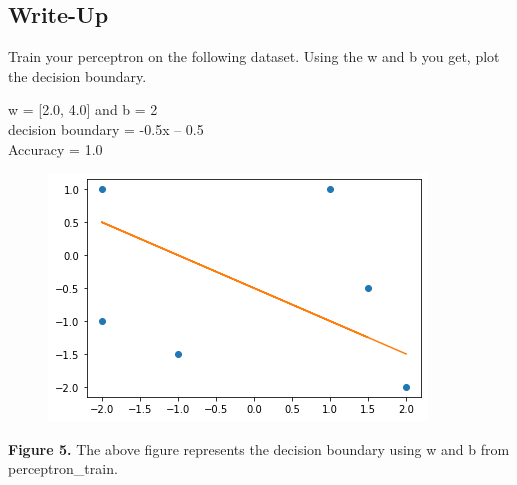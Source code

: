 \documentclass[11pt]{article}
\theoremstyle{definition}
\begin{document}
\clearpage
\subsection{Write-Up}
\begin{shaded}
Train your perceptron on the following dataset. Using the w and b you get, plot the decision boundary.

\begin{center}
\textsf{w = [2.0, 4.0]} and \textsf{b = 2}
\\
\textsf{decision boundary = -0.5x – 0.5}  
\\
Accuracy = 1.0
\end{center}
\end{shaded}

\begin{figure}[hbt!]
 \centering
 \includegraphics[scale=0.90]{Perceptron_plot}
\end{figure}
\textbf{Figure 5.} The above figure represents the decision boundary using \textsf{w} and \textsf{b} from \textsf{perceptron\_train}.
 
\end{document}
